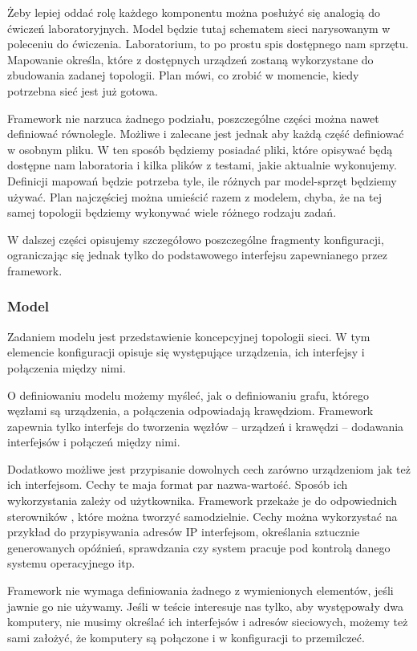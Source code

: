 \documentclass[00-praca-magisterska.tex]{subfiles}
\begin{document}
Żeby lepiej oddać rolę każdego komponentu można posłużyć się analogią do
ćwiczeń laboratoryjnych. Model będzie tutaj schematem sieci narysowanym w
poleceniu do ćwiczenia. Laboratorium, to po prostu spis dostępnego nam
sprzętu. Mapowanie określa, które z dostępnych urządzeń zostaną wykorzystane
do zbudowania zadanej topologii. Plan mówi, co zrobić w momencie, kiedy
potrzebna sieć jest już gotowa.

Framework nie narzuca żadnego podziału, poszczególne części można nawet
definiować równolegle. Możliwe i zalecane jest jednak aby każdą część
definiować w osobnym pliku. W ten sposób będziemy posiadać pliki,
które opisywać będą dostępne nam laboratoria i kilka plików z testami, jakie
aktualnie wykonujemy. Definicji mapowań będzie potrzeba tyle, ile różnych par
model-sprzęt będziemy używać. Plan najczęściej można umieścić razem z modelem,
chyba, że na tej samej topologii będziemy wykonywać wiele różnego rodzaju
zadań.

W dalszej części opisujemy szczegółowo poszczególne fragmenty konfiguracji,
ograniczając się jednak tylko do podstawowego interfejsu zapewnianego przez
framework. 

\subsubsection{Model}

Zadaniem modelu jest przedstawienie koncepcyjnej topologii sieci. W tym
elemencie konfiguracji opisuje się występujące urządzenia, ich interfejsy i
połączenia między nimi.

O definiowaniu modelu możemy myśleć, jak o definiowaniu grafu, którego węzłami
są urządzenia, a połączenia odpowiadają krawędziom. Framework zapewnia tylko
interfejs do tworzenia węzłów -- urządzeń i krawędzi -- dodawania interfejsów
i połączeń między nimi.

Dodatkowo możliwe jest przypisanie dowolnych cech zarówno urządzeniom jak też
ich interfejsom. Cechy te maja format par nazwa-wartość. Sposób ich
wykorzystania zależy od użytkownika. Framework przekaże je do odpowiednich
sterowników , które można
tworzyć samodzielnie. Cechy można wykorzystać na przykład do przypisywania
adresów IP interfejsom, określania sztucznie generowanych opóźnień,
sprawdzania czy system pracuje pod kontrolą danego systemu operacyjnego itp.

Framework nie wymaga definiowania żadnego z wymienionych elementów, jeśli
jawnie go nie używamy. Jeśli w teście interesuje nas tylko, aby występowały
dwa komputery, nie musimy określać ich interfejsów i adresów sieciowych,
możemy też sami założyć, że komputery są połączone i w konfiguracji to
przemilczeć.
\end{document}
